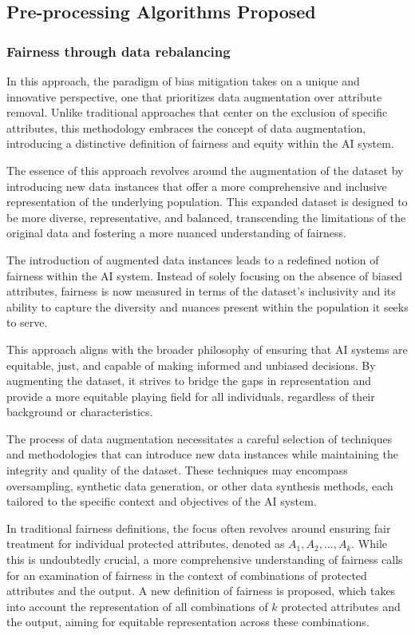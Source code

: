\documentclass[12pt,a4paper,openright,twoside]{book}
\begin{document}
\subsection{Pre-processing Algorithms Proposed}

\subsubsection{Fairness through data rebalancing}
\label{subsec:ftdr}

In this approach, the paradigm of bias mitigation takes on a unique and innovative perspective, one that prioritizes data augmentation over attribute removal. Unlike traditional approaches that center on the exclusion of specific attributes, this methodology embraces the concept of data augmentation, introducing a distinctive definition of fairness and equity within the AI system.

The essence of this approach revolves around the augmentation of the dataset by introducing new data instances that offer a more comprehensive and inclusive representation of the underlying population. This expanded dataset is designed to be more diverse, representative, and balanced, transcending the limitations of the original data and fostering a more nuanced understanding of fairness. 

The introduction of augmented data instances leads to a redefined notion of fairness within the AI system. Instead of solely focusing on the absence of biased attributes, fairness is now measured in terms of the dataset's inclusivity and its ability to capture the diversity and nuances present within the population it seeks to serve. 

This approach aligns with the broader philosophy of ensuring that AI systems are equitable, just, and capable of making informed and unbiased decisions. By augmenting the dataset, it strives to bridge the gaps in representation and provide a more equitable playing field for all individuals, regardless of their background or characteristics. 

The process of data augmentation necessitates a careful selection of techniques and methodologies that can introduce new data instances while maintaining the integrity and quality of the dataset. These techniques may encompass oversampling, synthetic data generation, or other data synthesis methods, each tailored to the specific context and objectives of the AI system.

In traditional fairness definitions, the focus often revolves around ensuring fair treatment for individual protected attributes, denoted as $A_1, A_2, \ldots, A_k$. While this is undoubtedly crucial, a more comprehensive understanding of fairness calls for an examination of fairness in the context of combinations of protected attributes and the output. A new definition of fairness is proposed, which takes into account the representation of all combinations of $k$ protected attributes and the output, aiming for equitable representation across these combinations.
\end{document}
